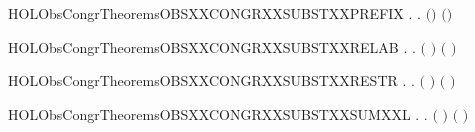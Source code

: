 \newcommand{\HOLObsCongrTheoremsOBSXXCONGRXXSUBSTXXPARXXR}{\UseVerbatim{HOLObsCongrTheoremsOBSXXCONGRXXSUBSTXXPARXXR}}
\begin{SaveVerbatim}{HOLObsCongrTheoremsOBSXXCONGRXXSUBSTXXPREFIX}
\HOLTokenTurnstile{} \HOLSymConst{\HOLTokenForall{}} .    \HOLSymConst{\HOLTokenImp{}} \HOLSymConst{\HOLTokenForall{}}.  \ensuremath{(}\HOLSymConst{\ensuremath{\ldotp}}\ensuremath{)} \ensuremath{(}\HOLSymConst{\ensuremath{\ldotp}}\ensuremath{)}
\end{SaveVerbatim}
\newcommand{\HOLObsCongrTheoremsOBSXXCONGRXXSUBSTXXPREFIX}{\UseVerbatim{HOLObsCongrTheoremsOBSXXCONGRXXSUBSTXXPREFIX}}
\begin{SaveVerbatim}{HOLObsCongrTheoremsOBSXXCONGRXXSUBSTXXRELAB}
\HOLTokenTurnstile{} \HOLSymConst{\HOLTokenForall{}} .
          \HOLSymConst{\HOLTokenImp{}}
       \HOLSymConst{\HOLTokenForall{}}.  \ensuremath{(}  \ensuremath{)} \ensuremath{(}  \ensuremath{)}
\end{SaveVerbatim}
\newcommand{\HOLObsCongrTheoremsOBSXXCONGRXXSUBSTXXRELAB}{\UseVerbatim{HOLObsCongrTheoremsOBSXXCONGRXXSUBSTXXRELAB}}
\begin{SaveVerbatim}{HOLObsCongrTheoremsOBSXXCONGRXXSUBSTXXRESTR}
\HOLTokenTurnstile{} \HOLSymConst{\HOLTokenForall{}} .    \HOLSymConst{\HOLTokenImp{}} \HOLSymConst{\HOLTokenForall{}}.  \ensuremath{(}  \ensuremath{)} \ensuremath{(}  \ensuremath{)}
\end{SaveVerbatim}
\newcommand{\HOLObsCongrTheoremsOBSXXCONGRXXSUBSTXXRESTR}{\UseVerbatim{HOLObsCongrTheoremsOBSXXCONGRXXSUBSTXXRESTR}}
\begin{SaveVerbatim}{HOLObsCongrTheoremsOBSXXCONGRXXSUBSTXXSUMXXL}
\HOLTokenTurnstile{} \HOLSymConst{\HOLTokenForall{}} .    \HOLSymConst{\HOLTokenImp{}} \HOLSymConst{\HOLTokenForall{}}.  \ensuremath{(} \HOLSymConst{\ensuremath{+}} \ensuremath{)} \ensuremath{(} \HOLSymConst{\ensuremath{+}} \ensuremath{)}
\end{SaveVerbatim}
